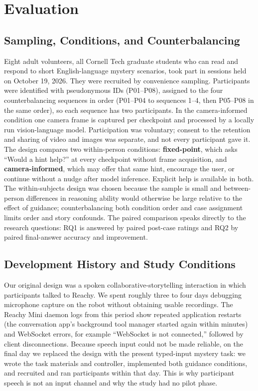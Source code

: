 \documentclass[conference]{IEEEtran}
\begin{document}
\section{Evaluation}
\subsection{Sampling, Conditions, and Counterbalancing}
Eight adult volunteers, all Cornell Tech graduate students who can read and respond to short English-language mystery scenarios, took part in sessions held on October 19, 2026. They were recruited by convenience sampling. Participants were identified with pseudonymous IDs (P01--P08), assigned to the four counterbalancing sequences in order (P01--P04 to sequences 1--4, then P05--P08 in the same order), so each sequence has two participants. In the camera-informed condition one camera frame is captured per checkpoint and processed by a locally run vision-language model. Participation was voluntary; consent to the retention and sharing of video and images was separate, and not every participant gave it. The design compares two within-person conditions: \textbf{fixed-point}, which asks ``Would a hint help?'' at every checkpoint without frame acquisition, and \textbf{camera-informed}, which may offer that same hint, encourage the user, or continue without a nudge after model inference. Explicit help is available in both. The within-subjects design was chosen because the sample is small and between-person differences in reasoning ability would otherwise be large relative to the effect of guidance; counterbalancing both condition order and case assignment limits order and story confounds. The paired comparison speaks directly to the research questions: RQ1 is answered by paired post-case ratings and RQ2 by paired final-answer accuracy and improvement.

\subsection{Development History and Study Conditions}
Our original design was a spoken collaborative-storytelling interaction in which participants talked to Reachy. We spent roughly three to four days debugging microphone capture on the robot without obtaining usable recordings. The Reachy Mini daemon logs from this period show repeated application restarts (the conversation app's background tool manager started again within minutes) and WebSocket errors, for example ``WebSocket is not connected,'' followed by client disconnections. Because speech input could not be made reliable, on the final day we replaced the design with the present typed-input mystery task: we wrote the task materials and controller, implemented both guidance conditions, and recruited and ran participants within that day. This is why participant speech is not an input channel and why the study had no pilot phase.
\end{document}
